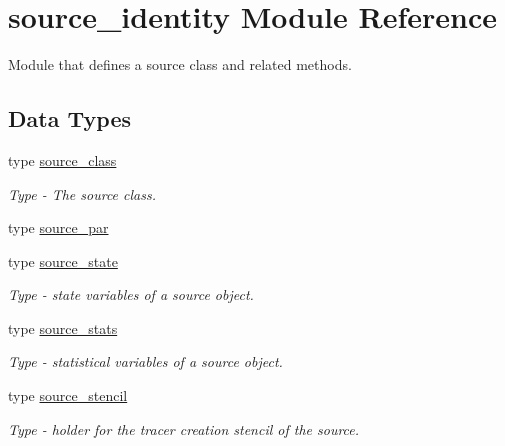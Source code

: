 \hypertarget{namespacesource__identity}{}\section{source\+\_\+identity Module Reference}
\label{namespacesource__identity}


Module that defines a source class and related methods.  


\subsection*{Data Types}
\begin{DoxyCompactItemize}
\item 
type \hyperlink{structsource__identity_1_1source__class}{source\+\_\+class}
\begin{DoxyCompactList}\small\item\em Type -\/ The source class. \end{DoxyCompactList}\item 
type \hyperlink{structsource__identity_1_1source__par}{source\+\_\+par}
\item 
type \hyperlink{structsource__identity_1_1source__state}{source\+\_\+state}
\begin{DoxyCompactList}\small\item\em Type -\/ state variables of a source object. \end{DoxyCompactList}\item 
type \hyperlink{structsource__identity_1_1source__stats}{source\+\_\+stats}
\begin{DoxyCompactList}\small\item\em Type -\/ statistical variables of a source object. \end{DoxyCompactList}\item 
type \hyperlink{structsource__identity_1_1source__stencil}{source\+\_\+stencil}
\begin{DoxyCompactList}\small\item\em Type -\/ holder for the tracer creation stencil of the source. \end{DoxyCompactList}\end{DoxyCompactItemize}
